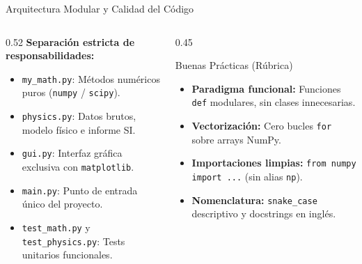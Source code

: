 \documentclass[aspectratio=169, 10pt]{beamer}
\begin{document}
\begin{frame}{Arquitectura Modular y Calidad del Código}
    \begin{columns}[T]
        \begin{column}{0.52\textwidth}
            \textbf{Separación estricta de responsabilidades:}
            \vspace{0.15cm}
            \begin{itemize}
                \item \texttt{my\_math.py}: Métodos numéricos puros (\texttt{numpy} / \texttt{scipy}).
                \item \texttt{physics.py}: Datos brutos, modelo físico e informe SI.
                \item \texttt{gui.py}: Interfaz gráfica exclusiva con \texttt{matplotlib}.
                \item \texttt{main.py}: Punto de entrada único del proyecto.
                \item \texttt{test\_math.py} y \texttt{test\_physics.py}: Tests unitarios funcionales.
            \end{itemize}
        \end{column}
        \begin{column}{0.45\textwidth}
            \begin{block}{Buenas Prácticas (Rúbrica)}
                \begin{itemize}
                    \item \textbf{Paradigma funcional:} Funciones \texttt{def} modulares, sin clases innecesarias.
                    \item \textbf{Vectorización:} Cero bucles \texttt{for} sobre arrays NumPy.
                    \item \textbf{Importaciones limpias:} \texttt{from numpy import ...} (sin alias \texttt{np}).
                    \item \textbf{Nomenclatura:} \texttt{snake\_case} descriptivo y docstrings en inglés.
                \end{itemize}
            \end{block}
        \end{column}
    \end{columns}
\end{frame}
\end{document}
